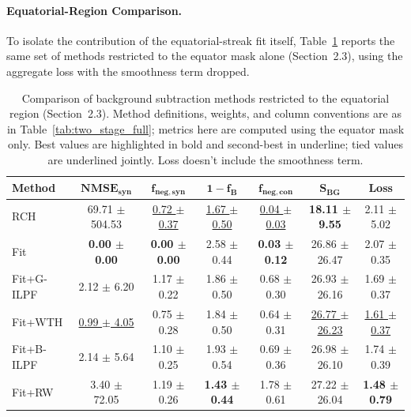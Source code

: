 \documentclass[iucr]{iucrjournals}
\begin{document}
\paragraph{Equatorial-Region Comparison.}
To isolate the contribution of the equatorial-streak fit itself, Table~\ref{tab:two_stage_equator} reports the same set of methods restricted to the equator mask alone (Section~2.3), using the aggregate loss with the smoothness term dropped.




\begin{table}[t]
\caption{Comparison of background subtraction methods restricted to the equatorial region (Section~2.3). Method definitions, weights, and column conventions are as in Table~\ref{tab:two_stage_full}; metrics here are computed using the equator mask only. Best values are highlighted in bold and second-best in underline; tied values are underlined jointly. Loss doesn't include the smoothness term.}
\label{tab:two_stage_equator}
\centering
\small
\setlength{\tabcolsep}{3pt}
\renewcommand{\arraystretch}{1.1}
\begin{tabular}{@{}lcccccc@{}}
\toprule
\textbf{Method} & $\mathbf{NMSE}_{\mathbf{syn}}$ & $\mathbf{f}_{\mathbf{neg,syn}}$ & $\mathbf{1-f_B}$ & $\mathbf{f}_{\mathbf{neg,con}}$ & $\mathbf{S}_{\mathbf{BG}}$ & \textbf{Loss} \\
\midrule
RCH & 69.71 $\pm$ 504.53 & \underline{0.72 $\pm$ 0.37} & \underline{1.67 $\pm$ 0.50} & \underline{0.04 $\pm$ 0.03} & \textbf{18.11 $\pm$ 9.55} & 2.11 $\pm$ 5.02 \\
Fit & \textbf{0.00 $\pm$ 0.00} & \textbf{0.00 $\pm$ 0.00} & 2.58 $\pm$ 0.44 & \textbf{0.03 $\pm$ 0.12} & 26.86 $\pm$ 26.47 & 2.07 $\pm$ 0.35 \\
Fit+G-ILPF & 2.12 $\pm$ 6.20 & 1.17 $\pm$ 0.22 & 1.86 $\pm$ 0.50 & 0.68 $\pm$ 0.30 & 26.93 $\pm$ 26.16 & 1.69 $\pm$ 0.37 \\
Fit+WTH & \underline{0.99 $\pm$ 4.05} & 0.75 $\pm$ 0.28 & 1.84 $\pm$ 0.50 & 0.64 $\pm$ 0.31 & \underline{26.77 $\pm$ 26.23} & \underline{1.61 $\pm$ 0.37} \\
Fit+B-ILPF & 2.14 $\pm$ 5.64 & 1.10 $\pm$ 0.25 & 1.93 $\pm$ 0.54 & 0.69 $\pm$ 0.36 & 26.98 $\pm$ 26.10 & 1.74 $\pm$ 0.39 \\
Fit+RW & 3.40 $\pm$ 72.05 & 1.19 $\pm$ 0.26 & \textbf{1.43 $\pm$ 0.44} & 1.78 $\pm$ 0.61 & 27.22 $\pm$ 26.04 & \textbf{1.48 $\pm$ 0.79} \\
\bottomrule
\end{tabular}
\end{table}
\end{document}
